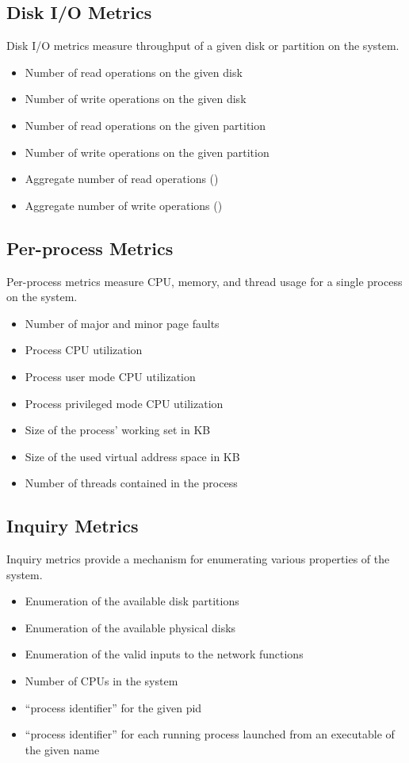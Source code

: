 \subsection{Disk I/O Metrics}
Disk I/O metrics measure throughput of a given disk or partition on the system.
\begin{itemize}
\item Number of read operations on the given disk 
\item Number of write operations on the given disk 
\item Number of read operations on the given partition 
\item Number of write operations on the given partition 
\item Aggregate number of read operations (\dcamp) 
\item Aggregate number of write operations (\dcamp)
\end{itemize}

\subsection{Per-process Metrics}
Per-process metrics measure CPU, memory, and thread usage for a single process on the system.
\begin{itemize}
\item Number of major and minor page faults 
\item Process CPU utilization 
\item Process user mode CPU utilization 
\item Process privileged mode CPU utilization 
\item Size of the process' working set in KB 
\item Size of the used virtual address space in KB 
\item Number of threads contained in the process
\end{itemize}

\subsection{Inquiry Metrics}
Inquiry metrics provide a mechanism for enumerating various properties of the system.
\begin{itemize}
\item Enumeration of the available disk partitions 
\item Enumeration of the available physical disks 
\item Enumeration of the valid inputs to the network functions 
\item Number of CPUs in the system 
\item ``process identifier'' for the given pid 
\item ``process identifier'' for each running process launched from an executable of the given name
\end{itemize}

